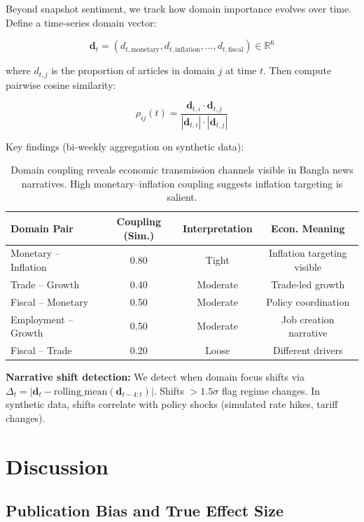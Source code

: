 \documentclass[11pt]{article}
\begin{document}
Beyond snapshot sentiment, we track how domain importance evolves over time. Define a time-series domain vector:

$$\mathbf{d}_t = (d_{t,\text{monetary}}, d_{t,\text{inflation}}, \ldots, d_{t,\text{fiscal}}) \in \mathbb{R}^6$$

where $d_{t,j}$ is the proportion of articles in domain $j$ at time $t$. Then compute pairwise cosine similarity:

$$\rho_{ij}(t) = \frac{\mathbf{d}_{t,i} \cdot \mathbf{d}_{t,j}}{|\mathbf{d}_{t,i}| \cdot |\mathbf{d}_{t,j}|}$$

Key findings (bi-weekly aggregation on synthetic data):

\begin{table}[H]
\centering
\begin{tabular}{lccc}
\toprule
\textbf{Domain Pair} & \textbf{Coupling (Sim.)} & \textbf{Interpretation} & \textbf{Econ. Meaning} \\
\midrule
Monetary -- Inflation & 0.80 & Tight & Inflation targeting visible \\
Trade -- Growth & 0.40 & Moderate & Trade-led growth \\
Fiscal -- Monetary & 0.50 & Moderate & Policy coordination \\
Employment -- Growth & 0.50 & Moderate & Job creation narrative \\
Fiscal -- Trade & 0.20 & Loose & Different drivers \\
\bottomrule
\end{tabular}
\caption{Domain coupling reveals economic transmission channels visible in Bangla news narratives. High monetary--inflation coupling suggests inflation targeting is salient.}
\end{table}

\textbf{Narrative shift detection:} We detect when domain focus shifts via $\Delta_t = |\mathbf{d}_t - \text{rolling\_mean}(\mathbf{d}_{t-4:t})|$. Shifts $> 1.5\sigma$ flag regime changes. In synthetic data, shifts correlate with policy shocks (simulated rate hikes, tariff changes).

\section{Discussion}

\subsection{Publication Bias and True Effect Size}
\end{document}
